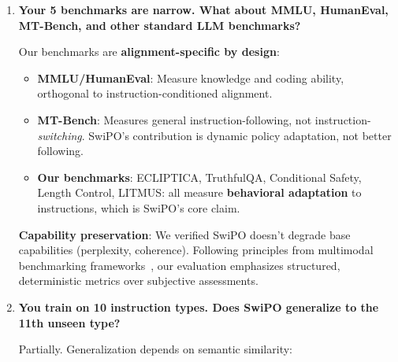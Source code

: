 \begin{enumerate}[label=\textbf{Q\arabic*.}, leftmargin=*, itemsep=8pt]
\textbf{Key differentiator}: RLHF produces a fixed policy. Changing alignment behavior requires retraining. SwiPO enables runtime policy switching via instructions, a capability RLHF cannot provide without architectural changes.

\vspace{4mm}

\item \textbf{Your 5 benchmarks are narrow. What about MMLU, HumanEval, MT-Bench, and other standard LLM benchmarks?}

 Our benchmarks are \textbf{alignment-specific by design}:

\begin{itemize}[leftmargin=*,itemsep=2pt]
    \item \textbf{MMLU/HumanEval}: Measure knowledge and coding ability, orthogonal to instruction-conditioned alignment.

    \item \textbf{MT-Bench}: Measures general instruction-following, not instruction-\textit{switching}. SwiPO's contribution is dynamic policy adaptation, not better following.

    \item \textbf{Our benchmarks}: ECLIPTICA, TruthfulQA, Conditional Safety, Length Control, LITMUS: all measure \textbf{behavioral adaptation} to instructions, which is SwiPO's core claim.
\end{itemize}

\textbf{Capability preservation}: We verified SwiPO doesn't degrade base capabilities (perplexity, coherence). Following principles from multimodal benchmarking frameworks~\cite{wanaskar2025multimodal}, our evaluation emphasizes structured, deterministic metrics over subjective assessments.

\vspace{4mm}

\item \textbf{You train on 10 instruction types. Does SwiPO generalize to the 11th unseen type?}

 Partially. Generalization depends on semantic similarity:


\end{enumerate}
